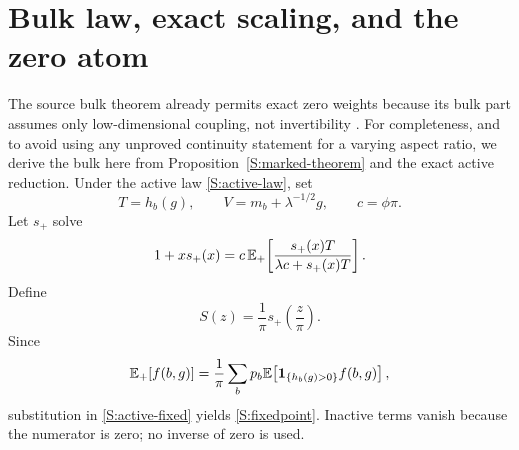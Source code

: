 \section{Bulk law, exact scaling, and the zero atom}

The source bulk theorem already permits exact zero weights because its bulk
part assumes only low-dimensional coupling, not invertibility
\cite{BenArousEtAl2025}. For completeness, and to avoid using any unproved
continuity statement for a varying aspect ratio, we derive the bulk here
from Proposition~\ref{S:marked-theorem} and the exact active reduction.
Under the active law
\eqref{S:active-law}, set
\begin{equation}
T=h_b(g),\qquad V=m_b+\lambda^{-1/2}g,\qquad c=\phi\pi.
\end{equation}
Let $s_+$ solve
\begin{equation}
1+xs_+(x)
=
c\,\mathbb{E}_+\!\left[
\frac{s_+(x)T}{\lambda c+s_+(x)T}
\right].
\label{S:active-fixed}
\end{equation}
Define
\begin{equation}
S(z)=\frac1\pi s_+\!\left(\frac z\pi\right).
\label{S:Sscale}
\end{equation}
Since
\begin{equation}
\mathbb{E}_+[f(b,g)]
=
\frac1\pi\sum_bp_b
\mathbb{E}\!\left[\mathbf{1}_{\{h_b(g)>0\}}f(b,g)\right],
\end{equation}
substitution in \eqref{S:active-fixed} yields \eqref{S:fixedpoint}. Inactive terms vanish because the numerator is zero; no inverse of zero is used.

